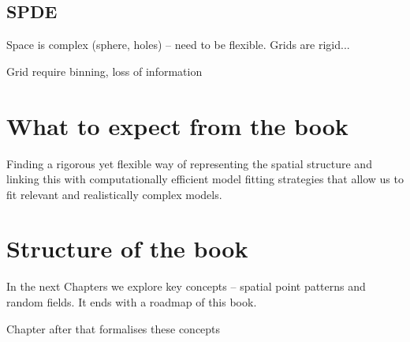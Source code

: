 \subsection{SPDE}

Space is complex (sphere, holes) -- need to be flexible. Grids are rigid... 

Grid require binning, loss of information




\section{What to expect from the book}

Finding a rigorous yet flexible way of representing the spatial structure and linking this with computationally efficient model fitting strategies that allow us to fit relevant and realistically complex models.



\section{Structure of the book}

In the next Chapters we explore key concepts  -- spatial point patterns and random fields. It ends with a roadmap of this book.
 
Chapter after that formalises these concepts



